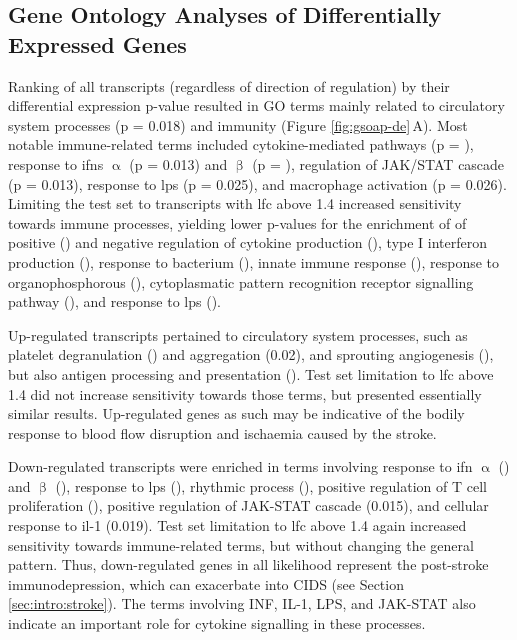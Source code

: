 \subsection{Gene Ontology Analyses of Differentially Expressed Genes} \label{sec:stroke:large-rna-go}
Ranking of all transcripts (regardless of direction of regulation) by their differential expression p-value resulted in GO terms mainly related to circulatory system processes (p = 0.018) and immunity (Figure \ref{fig:gsoap-de}\,A). Most notable immune-related terms included cytokine-mediated pathways (p = ), response to \acp{ifn} $\upalpha$ (p = 0.013) and $\upbeta$ (p = ), regulation of JAK/STAT cascade (p = 0.013), response to \ac{lps} (p = 0.025), and macrophage activation (p = 0.026). Limiting the test set to transcripts with \ac{lfc} above 1.4\,\,increased sensitivity towards immune processes, yielding lower p-values for the enrichment of of positive () and negative regulation of cytokine production (), type I interferon production (), response to bacterium (), innate immune response (), response to organophosphorous (), cytoplasmatic pattern recognition receptor signalling pathway (), and response to \ac{lps} ().

Up-regulated transcripts pertained to circulatory system processes, such as platelet degranulation () and aggregation (0.02), and sprouting angiogenesis (), but also antigen processing and presentation (). Test set limitation to \ac{lfc} above 1.4 did not increase sensitivity towards those terms, but presented essentially similar results. Up-regulated genes as such may be indicative of the bodily response to blood flow disruption and ischaemia caused by the stroke. 

Down-regulated transcripts were enriched in terms involving response to \ac{ifn} $\upalpha$ () and $\upbeta$ (), response to \ac{lps} (), rhythmic process (), positive regulation of T cell proliferation (), positive regulation of JAK-STAT cascade (0.015), and cellular response to \ac{il}-1 (0.019). Test set limitation to \ac{lfc} above 1.4 again increased sensitivity towards immune-related terms, but without changing the general pattern. Thus, down-regulated genes in all likelihood represent the post-stroke immunodepression, which can exacerbate into CIDS (see Section \ref{sec:intro:stroke}). The terms involving INF, IL-1, LPS, and JAK-STAT also indicate an important role for cytokine signalling in these processes.

